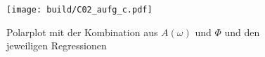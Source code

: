 \begin{figure}
    \centering
    \texttt{[image: build/C02\_aufg\_c.pdf]}
    \caption{Polarplot mit der Kombination aus $A(\omega)$ und $\Phi$ und den jeweiligen Regressionen}
    \label{fig:d_polarplot}
\end{figure}